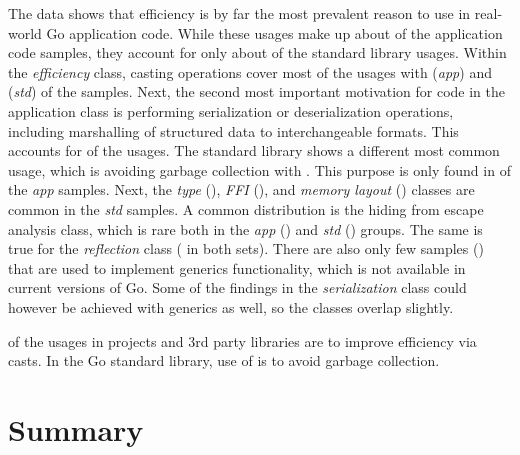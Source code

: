 The data shows that efficiency is by far the most prevalent reason to use \unsafe{} in real-world Go application code.
While these usages make up about  of the application code samples, they account for only about
 of the standard library usages.
Within the \textit{efficiency} class, casting operations cover most of the usages with  (\textit{app})
and  (\textit{std}) of the samples.
Next, the second most important motivation for \unsafe{} code in the application class is performing serialization or
deserialization operations, including marshalling of structured data to interchangeable formats.
This accounts for  of the usages.
The standard library shows a different most common usage, which is avoiding garbage collection with .
This purpose is only found in  of the \textit{app} samples.
Next, the \textit{type} (), \textit{\acrshort{FFI}} (), and \textit{memory layout}
() classes are common in the \textit{std} samples.
A common distribution is the hiding from escape analysis class, which is rare both in the \textit{app}
() and \textit{std} () groups.
The same is true for the \textit{reflection} class ( in both sets).
There are also only few samples () that are used to implement generics functionality, which is not
available in current versions of Go.
Some of the findings in the \textit{serialization} class could however be achieved with generics as well, so the classes
overlap slightly.

\begin{answerToRQ}[\ref{rq:purpose}]
     of the \unsafe{} usages in projects and 3rd party libraries are to improve efficiency via
    \unsafe{} casts.
    In the Go standard library,  use of \unsafe{} is to avoid garbage collection.
\end{answerToRQ}



\section{Summary}\label{sec:go-geiger:summary}

